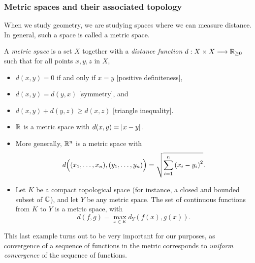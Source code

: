\documentclass[twoside]{article}
\newcommand*{\1}{\mathbbm{1}}
\begin{document}
\subsubsection{Metric spaces and their associated topology}
When we study geometry, we are studying spaces where we can measure distance. In general, such a space is called a metric space.
\begin{defn}
  A \emph{metric space} is a set \(X\) together with a \textit{distance function} \(d:X\times X \longrightarrow\mathbb{R}_{\ge 0}\) such that for all points \(x,y,z\) in \(X\),
\end{defn}
  \begin{itemize}
  \item \(d(x,y) = 0\) if and only if \(x=y\) [positive definiteness],
  \item \(d(x,y) = d(y,x)\) [symmetry], and
  \item \(d(x,y) + d(y,z) \ge d(x,z)\) [triangle inequality].
\end{itemize}
\begin{exmps}\mbox{}
  \begin{itemize}
    \item \(\mathbb{R}\) is a metric space with \(d(x,y) = \abs{x-y}\).
    \item More generally, \(\mathbb{R}^n\) is a metric space with
    \[d\del[2]{(x_1,\dots,x_n), (y_1,\dots,y_n)} = \sqrt{\sum_{i=1}^n \del{x_i-y_i}^2}.\]
    \item Let \(K\) be a compact topological space (for instance, a closed and bounded subset of \(\mathbb{C}\)), and let \(Y\) be any metric space. The set of continuous functions from \(K\) to \(Y\) is a metric space, with
    \[
      d(f,g) = \max_{x\in K} d_Y(f(x), g(x)).
    \]
  \end{itemize}
  This last example turns out to be very important for our purposes, as convergence of a sequence of functions in the metric corresponds to \emph{uniform convergence} of the sequence of functions.
\end{exmps}
\end{document}

